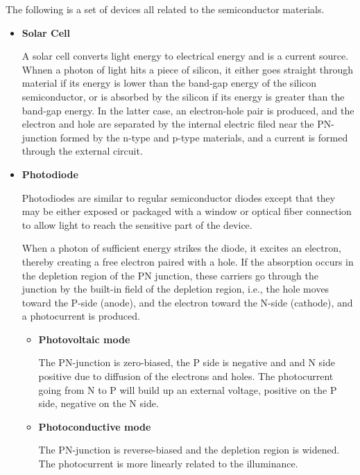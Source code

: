 The following is a set of devices all related to the semiconductor materials.
\begin{itemize}
\item {\bf Solar Cell}

A solar cell converts light energy to electrical energy and is a current source.
Whnen a photon of light hits a piece of silicon, it either goes straight through
material if its energy is lower than the band-gap energy of the silicon semiconductor,
or is absorbed by the silicon if its energy is greater than the band-gap energy.
In the latter case, an electron-hole pair is produced, and the electron and hole
are separated by the internal electric filed near the PN-junction formed by the 
n-type and p-type materials, and a current is formed through the external circuit.
  

\item {\bf Photodiode}

Photodiodes are similar to regular semiconductor diodes except that they 
may be either exposed or packaged with a window or optical fiber connection
to allow light to reach the sensitive part of the device. 

When a photon of sufficient energy strikes the diode, it excites an electron,
thereby creating a free electron paired with a hole. If the absorption occurs 
in the depletion region of the PN junction, these carriers go through the 
junction by the built-in field of the depletion region, i.e., the hole moves
toward the P-side (anode), and the electron toward the N-side (cathode), and
a photocurrent is produced.

\begin{itemize}

\item {\bf Photovoltaic mode}
  
  The PN-junction is zero-biased, the P side is negative and and N side positive 
  due to diffusion of the electrons and holes. The photocurrent going from N to P
  will build up an external voltage, positive on the P side, negative on the N
  side.
\item {\bf Photoconductive mode}

  The PN-junction is reverse-biased and the depletion region is widened. The 
  photocurrent is more linearly related to the illuminance.

\end{itemize} 



\end{itemize}
